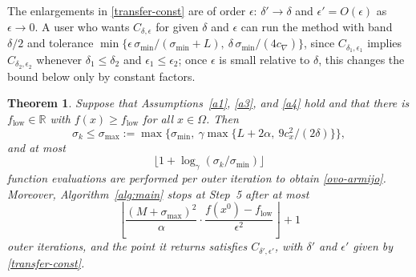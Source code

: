 \documentclass[11pt]{article}
\newcommand{\flow}{f_{\mathrm{low}}}
\newtheorem{theorem}{Theorem}[section]
\newcounter{alg}[section]
\begin{document}
The enlargements in \eqref{transfer-const} are of order $\epsilon$:
$\delta' \to \delta$ and $\epsilon' = O(\epsilon)$ as $\epsilon \to 0$. A user
who wants $C_{\delta,\epsilon}$ for given $\delta$ and $\epsilon$ can run the
method with band $\delta/2$ and tolerance
$\min\{\epsilon\,\sigma_{\min}/(\sigma_{\min} + L),\
\delta\,\sigma_{\min}/(4c_\nabla)\}$, since $C_{\delta_1,\epsilon_1}$ implies
$C_{\delta_2,\epsilon_2}$ whenever $\delta_1 \leq \delta_2$ and
$\epsilon_1 \leq \epsilon_2$; once $\epsilon$ is small relative to $\delta$, this
changes the bound below only by constant factors.

\begin{theorem} \label{teo:complexity}
Suppose that Assumptions~\ref{a1}, \ref{a3}, and \ref{a4} hold and
that there is
$\flow \in \mathbb{R}$ with $f(x) \geq \flow$ for all $x \in \Omega$. Then
\begin{equation} \label{cota-sigma}
\sigma_k \leq \sigma_{\max} := \max\big\{ \sigma_{\min},\
\gamma \max\{ L + 2\alpha,\ 9c_x^2/(2\delta) \} \big\},
\end{equation}
and at most
\begin{equation} \label{cota-fcnt}
\big\lfloor 1 + \log_\gamma( \sigma_k / \sigma_{\min} ) \big\rfloor
\end{equation}
function evaluations are performed per outer iteration to obtain
\eqref{ovo-armijo}. Moreover, Algorithm~\ref{alg:main} stops at Step~5 after at
most
\begin{equation} \label{cota-iter}
\left\lfloor \frac{( M + \sigma_{\max} )^2}{\alpha}
\cdot \frac{f(x^0) - \flow}{\epsilon^2} \right\rfloor + 1
\end{equation}
outer iterations, and the point it returns satisfies $C_{\delta',\epsilon'}$,
with $\delta'$ and $\epsilon'$ given by \eqref{transfer-const}.
\end{theorem}
\end{document}
